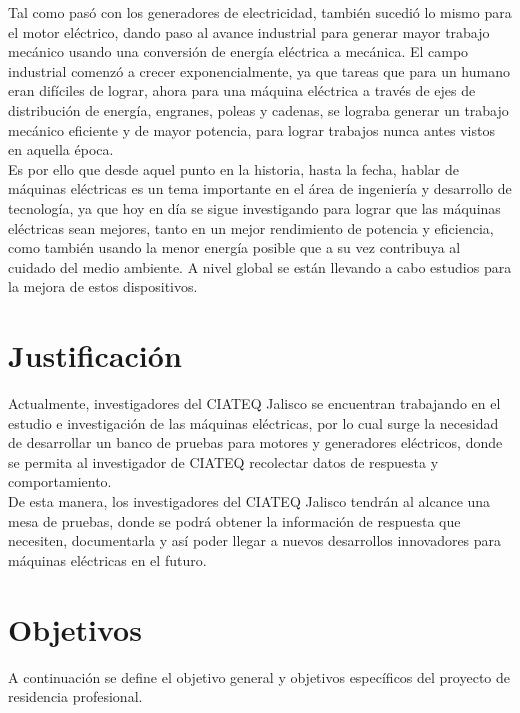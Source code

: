 \documentclass[12pt,titlepage]{article}
\begin{document}
Tal como pasó con los generadores de electricidad, también sucedió lo mismo para el motor eléctrico, dando paso al avance industrial para generar mayor trabajo mecánico usando una conversión de energía eléctrica a mecánica. El campo industrial comenzó a crecer exponencialmente, ya que tareas que para un humano eran difíciles de lograr, ahora para una máquina eléctrica a través de ejes de distribución de energía, engranes, poleas y cadenas, se lograba generar un trabajo mecánico eficiente y de mayor potencia, para lograr trabajos nunca antes vistos en aquella época. \\[0.15mm]

Es por ello que desde aquel punto en la historia, hasta la fecha, hablar de máquinas eléctricas es un tema importante en el área de ingeniería y desarrollo de tecnología, ya que hoy en día se sigue investigando para lograr que las máquinas eléctricas sean mejores, tanto en un mejor rendimiento de potencia y eficiencia, como también usando la menor energía posible que a su vez contribuya al cuidado del medio ambiente.  A nivel global se están llevando a cabo estudios para la mejora de estos dispositivos. \\[0.3mm]


\newpage
\section{Justificación}

Actualmente, investigadores del CIATEQ Jalisco  se encuentran trabajando en el estudio e investigación de las máquinas eléctricas, por lo cual surge la necesidad de desarrollar un banco de pruebas para motores y generadores eléctricos, donde se permita al investigador de CIATEQ recolectar datos de respuesta y comportamiento.\\

De esta manera, los investigadores del CIATEQ Jalisco tendrán al alcance una mesa de pruebas, donde se podrá obtener la información de respuesta que necesiten, documentarla y así poder llegar  a nuevos desarrollos innovadores para máquinas eléctricas en el futuro. \\

\newpage 
\section{Objetivos}
A continuación se define el objetivo general y objetivos específicos del proyecto de residencia profesional. 
\end{document}
